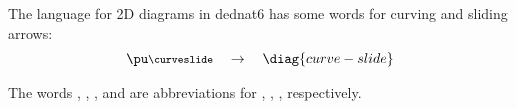 \documentclass[oneside]{article}
\begin{document}
The language for 2D diagrams in dednat6 has some words for curving and
sliding arrows:
%
%
$$\pu
  \myvcenter{\footnotesize\curveslide}
  \quad
  \to
  \quad
  \diag{curve-slide}
$$


The words , , , and  are
abbreviations for , ,
,  respectively.


\end{document}
